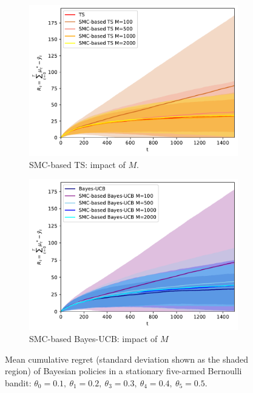 \begin{figure}[!h]
	\begin{subfigure}[b]{0.46\textwidth}
		\centering
		\includegraphics[width=\textwidth]{./fods_figs/static/bernoulli/A5/theta0.1_0.2_0.3_0.4_0.5_allM_cumulative_regret_ts}
		\caption{SMC-based TS: impact of $M$.}
	\end{subfigure}
	\begin{subfigure}[b]{0.46\textwidth}
		\centering
		\includegraphics[width=\textwidth]{./fods_figs/static/bernoulli/A5/theta0.1_0.2_0.3_0.4_0.5_allM_cumulative_regret_bucb}
		\caption{SMC-based Bayes-UCB: impact of $M$}
	\end{subfigure}
	
	\caption{Mean cumulative regret (standard deviation shown as the shaded region) of Bayesian policies in a stationary five-armed Bernoulli bandit:
		$\theta_0=0.1, \ \theta_1=0.2, \ \theta_3=0.3, \ \theta_4=0.4, \ \theta_5=0.5$.
	}
\end{figure}

